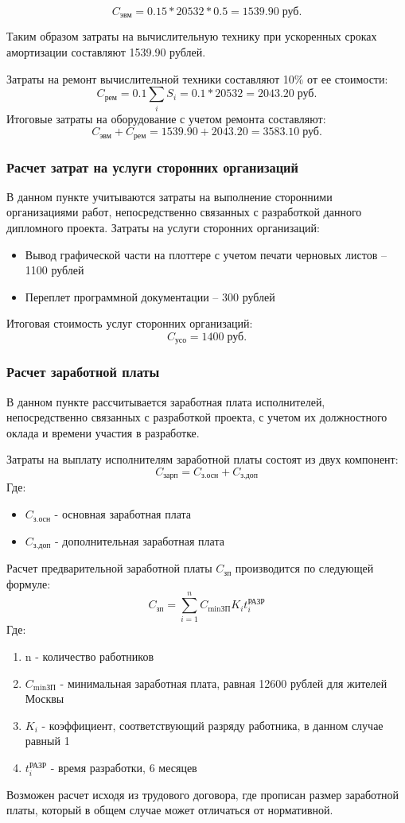 \documentclass[russian,utf8,emptystyle]{eskdtext}
\begin{document}
\begin{spacing}{1.5}
$$
C_\text{эвм} = 0.15 * 20532 * 0.5 = 1539.90 \; \text{руб.}
$$

Таким образом затраты на вычислительную технику при ускоренных сроках амортизации составляют 1539.90 рублей.

Затраты на ремонт вычислительной техники составляют 10\% от ее стоимости:
$$
C_\text{рем} = 0.1 \sum_i S_i = 0.1 * 20532 = 2043.20 \; \text{руб.}
$$
Итоговые затраты на оборудование с учетом ремонта составляют:
$$
C_\text{эвм} + C_\text{рем} = 1539.90 + 2043.20 = 3583.10 \; \text{руб.}
$$

\subsubsection{Расчет затрат на услуги сторонних организаций}
В данном пункте учитываются затраты на выполнение сторонними организациями работ, непосредственно связанных с разработкой данного дипломного проекта.
Затраты на услуги сторонних организаций:
\begin{itemize}
\item Вывод графической части на плоттере с учетом печати черновых листов -- 1100 рублей
\item Переплет программной документации -- 300 рублей
\end{itemize}

Итоговая стоимость услуг сторонних организаций:
$$
C_\text{усо} = 1400 \; \text{руб.}
$$

\subsubsection{Расчет заработной платы}
В данном пункте рассчитывается заработная плата исполнителей, непосредственно связанных с разработкой проекта, с учетом их должностного оклада и времени участия в разработке. 

Затраты на выплату исполнителям заработной платы состоят из двух компонент:
$$
C_\text{зарп} = C_\text{з.осн} + C_\text{з.доп}
$$
Где:
\begin{itemize}
\item $C_\text{з.осн}$ - основная заработная плата
\item $C_\text{з.доп}$ - дополнительная заработная плата
\end{itemize}

Расчет предварительной заработной платы $C_\text{зп}$ производится по следующей формуле:
$$
C_\text{зп} = \sum_{i=1}^n C_\text{minЗП} K_i t_i^\text{РАЗР}
$$
Где:
\begin{enumerate}
\item n - количество работников
\item $C_\text{minЗП}$ - минимальная заработная плата, равная 12600 рублей для жителей Москвы
\item $K_i$ - коэффициент, соответствующий разряду работника, в данном случае равный 1
\item $t_i^\text{РАЗР}$ - время разработки, 6 месяцев
\end{enumerate}
Возможен расчет исходя из трудового договора, где прописан размер заработной платы, который в общем случае может отличаться от нормативной.


\end{spacing}
\end{document}

